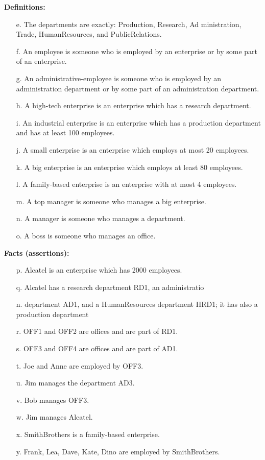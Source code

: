 \documentclass[11pt]{article}
\begin{document}
\noindent\textbf{Definitions:}

\begin{itemize}
    \item[e.] The departments are exactly: Production, Research, Ad
ministration, Trade, HumanResources, and PublicRelations.
\item[f.] An employee is someone who is employed by an enterprise or by some part of an enterprise.
\item[g.] An administrative-employee is someone who is employed by an administration department or by some part of an administration department.
\item[h.] A high-tech enterprise is an enterprise which has a research department.
\item[i.] An industrial enterprise is an enterprise which has a production department and has at least 100 employees.
\item[j.] A small enterprise is an enterprise which employs at most 20 employees.
\item[k.] A big enterprise is an enterprise which employs at least 80 employees.
\item[l.] A family-based enterprise is an enterprise with at most 4 employees.
\item[m.] A top manager is someone who manages a big enterprise.
\item[n.] A manager is someone who manages a department.
\item[o.] A boss is someone who manages an office.
\end{itemize}

\noindent\textbf{Facts (assertions):}
\begin{itemize}
    \item[p.] Alcatel is an enterprise which has 2000 employees.
    \item[q.] Alcatel has a research department RD1, an administratio
    \item[n.] department AD1, and a HumanResources department HRD1; it has also a production department
    \item[r.] OFF1 and OFF2 are offices and are part of RD1.
    \item[s.] OFF3 and OFF4 are offices and are part of AD1.
    \item[t.] Joe and Anne are employed by OFF3.
    \item[u.] Jim manages the department AD3.
    \item[v.] Bob manages OFF3.
    \item[w.] Jim manages Alcatel.
    \item[x.] SmithBrothers is a family-based enterprise.
    \item[y.] Frank, Lea, Dave, Kate, Dino are employed by SmithBrothers.
\end{itemize}
\end{document}
